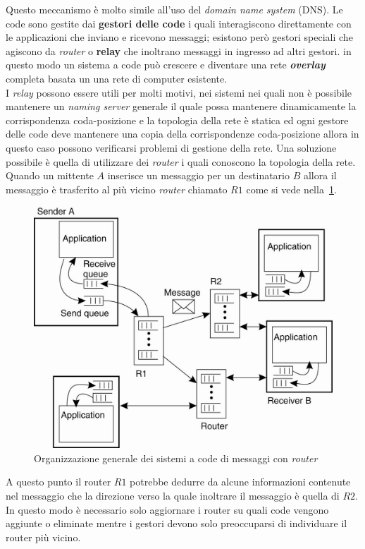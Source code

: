 Questo meccanismo è molto simile all'uso del \emph{domain name system} (DNS). Le code sono gestite dai \textbf{gestori delle code} i quali interagiscono direttamente con le applicazioni che inviano e ricevono messaggi; esistono però gestori speciali che agiscono da \emph{router} o \textbf{relay} che inoltrano messaggi in ingresso ad altri gestori. in questo modo un sistema a code può crescere e diventare una rete \textbf{\emph{overlay}} completa basata un una rete di computer esistente.\\
I \emph{relay} possono essere utili per molti motivi, nei sistemi nei quali non è possibile mantenere un \emph{naming server} generale il quale possa mantenere dinamicamente la corrispondenza coda-posizione e la topologia della rete è statica ed ogni gestore delle code deve mantenere una copia della corrispondenze coda-posizione allora in questo caso possono verificarsi problemi di gestione della rete. Una soluzione possibile è quella di utilizzare dei \emph{router} i quali conoscono la topologia della rete. Quando un mittente $A$ inserisce un messaggio per un destinatario $B$ allora il messaggio è trasferito al più vicino \emph{router} chiamato $R1$ come si vede nella \figurename\,\ref{img:queeuerouter}.
\begin{figure}
\centering
\includegraphics[scale=0.4]{img/queeuerouter.png}
\caption{Organizzazione generale dei sistemi a code di messaggi con \emph{router}}\label{img:queeuerouter}
\end{figure}
A questo punto il router $R1$ potrebbe dedurre da alcune informazioni contenute nel messaggio che la direzione verso la quale inoltrare il messaggio è quella di $R2$. In questo modo è necessario solo aggiornare i router su quali code vengono aggiunte o eliminate mentre i gestori devono solo preoccuparsi di individuare il router più vicino.\\
